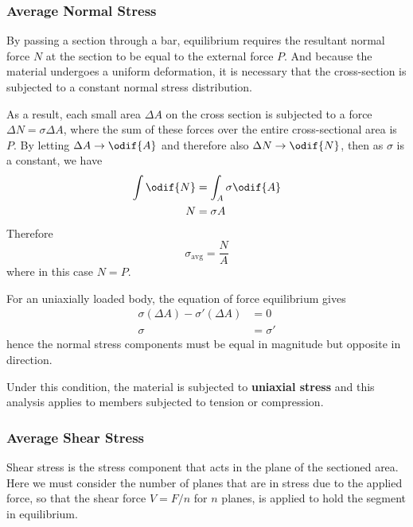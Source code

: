 \documentclass{article}
\begin{document}
\subsubsection{Average Normal Stress}
By passing a section through a bar, equilibrium requires the resultant normal force \(N\) at the section to be
equal to the external force \(P\). And because the material undergoes a uniform deformation, it is necessary
that the cross-section is subjected to a constant normal stress distribution.

As a result, each small area \(\Delta A\) on the cross section is subjected
to a force \(\Delta N = \sigma \Delta A\), where the sum of these forces over the entire cross-sectional area
is \(P\). By letting \(\Delta A \to \odif{A} \) and therefore also \( \Delta N \to \odif{N} \), then as \(\sigma\)
is a constant, we have
\begin{align*}
    \int \odif{N} & = \int_A \sigma \odif{A} \\
    N             & = \sigma A
\end{align*}
Therefore
\begin{equation*}
    \sigma_{\mathrm{avg}} = \frac{N}{A}
\end{equation*}
where in this case \(N = P\).
\begin{theorem}[Equilibrium]
    For an uniaxially loaded body, the equation of force equilibrium gives
    \begin{align*}
        \sigma \left( \Delta A \right) - \sigma' \left( \Delta A \right) & = 0       \\
        \sigma                                                           & = \sigma'
    \end{align*}
    hence the normal stress components must be equal in magnitude but opposite in direction.

    Under this condition, the material is subjected to \textbf{uniaxial stress} and this analysis
    applies to members subjected to tension or compression.
\end{theorem}
\subsubsection{Average Shear Stress}
Shear stress is the stress component that acts in the plane of the sectioned area.
Here we must consider the number of planes that are in stress due to the applied force,
so that the shear force \(V = F / n\) for \(n\) planes, is applied to hold the segment in
equilibrium.
\end{document}
